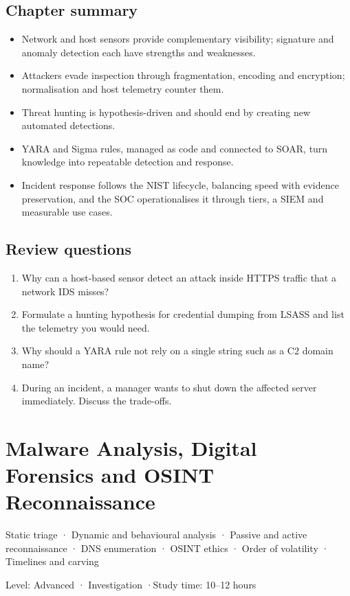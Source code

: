\documentclass[11pt,openany]{book}
\newcommand{\chaptermeta}[3]{%
  {\sffamily\small\color{accent}#1\par}\vspace{0.3em}
  {\sffamily\footnotesize\color{gray}#2 \quad·\quad #3\par}\vspace{1.2em}}
\begin{document}
\section*{Chapter summary}
\begin{itemize}
  \item Network and host sensors provide complementary visibility; signature and anomaly detection each have strengths and weaknesses.
  \item Attackers evade inspection through fragmentation, encoding and encryption; normalisation and host telemetry counter them.
  \item Threat hunting is hypothesis-driven and should end by creating new automated detections.
  \item YARA and Sigma rules, managed as code and connected to SOAR, turn knowledge into repeatable detection and response.
  \item Incident response follows the NIST lifecycle, balancing speed with evidence preservation, and the SOC operationalises it through tiers, a SIEM and measurable use cases.
\end{itemize}

\section*{Review questions}
\begin{enumerate}
  \item Why can a host-based sensor detect an attack inside HTTPS traffic that a network IDS misses?
  \item Formulate a hunting hypothesis for credential dumping from LSASS and list the telemetry you would need.
  \item Why should a YARA rule not rely on a single string such as a C2 domain name?
  \item During an incident, a manager wants to shut down the affected server immediately. Discuss the trade-offs.
\end{enumerate}

\chapter{Malware Analysis, Digital Forensics and OSINT Reconnaissance}\label{ch:12}
\chaptermeta{Static triage · Dynamic and behavioural analysis · Passive and active reconnaissance · DNS enumeration · OSINT ethics · Order of volatility · Timelines and carving}{Level: Advanced · Investigation}{Study time: 10–12 hours}
\end{document}
